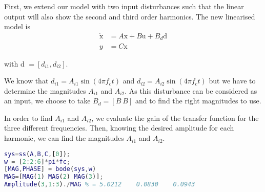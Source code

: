 First, we extend our model with two input disturbances such that the linear output will also show the second and third order harmonics. The new linearised model is
\begin{align*}
   \dot{\text{x}} &= A\text{x} + B\text{u} +B_d\text{d}\\
   y &= C\text{x}
\end{align*}

with d $= [d_{i1}, d_{i2}]$.

We know that $d_{i1} = A_{i1}\sin(4\pi f_ct)$ and $d_{i2} = A_{i2}\sin(4\pi f_ct)$ but we have to determine the magnitudes $A_{i1}$ and $A_{i2}$. As this disturbance can be considered as an input, we choose to take $B_d = [B\ B]$ and to find the right magnitudes to use.

In order to find $A_{i1}$ and $A_{i2}$, we evaluate the gain of the transfer function for the three different frequencies. Then, knowing the desired amplitude for each harmonic, we can find the magnitudes $A_{i1}$ and $A_{i2}$.

\begin{lstlisting}[language=Matlab]
sys=ss(A,B,C,[0]);
w = [2:2:6]*pi*fc;
[MAG,PHASE] = bode(sys,w)
MAG=[MAG(1) MAG(2) MAG(3)];
Amplitude(3,1:3)./MAG % = 5.0212    0.0830    0.0943
\end{lstlisting}